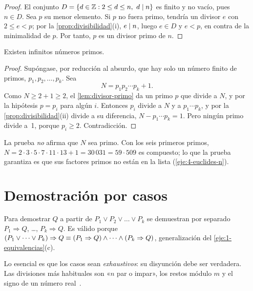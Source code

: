 \begin{proof}
El conjunto $D=\{d\in\mathbb{Z}: 2\le d\le n,\ d\mid n\}$ es finito y no vacío, pues $n\in D$. Sea $p$ su menor elemento. Si $p$ no fuera primo, tendría un divisor $e$ con $2\le e<p$; por la \cref{prop:divisibilidad}(i), $e\mid n$, luego $e\in D$ y $e<p$, en contra de la minimalidad de $p$. Por tanto, $p$ es un divisor primo de $n$.
\end{proof}

\begin{teorema}[Euclides]\label{teo:euclides}
Existen infinitos números primos.
\end{teorema}

\begin{proof}
Supóngase, por reducción al absurdo, que hay solo un número finito de primos, $p_1,p_2,\dots,p_k$. Sea
\[
N=p_1p_2\cdots p_k+1.
\]
Como $N\ge 2+1\ge 2$, el \cref{lem:divisor-primo} da un primo $p$ que divide a $N$, y por la hipótesis $p=p_i$ para algún $i$. Entonces $p_i$ divide a $N$ y a $p_1\cdots p_k$, y por la \cref{prop:divisibilidad}(ii) divide a su diferencia, $N-p_1\cdots p_k=1$. Pero ningún primo divide a~1, porque $p_i\ge 2$. Contradicción.
\end{proof}

\begin{observacion}
La prueba \emph{no} afirma que $N$ sea primo. Con los seis primeros primos, $N=2\cdot 3\cdot 5\cdot 7\cdot 11\cdot 13+1=30\,031=59\cdot 509$ es compuesto; lo que la prueba garantiza es que sus factores primos no están en la lista (\cref{eje:4-euclides-n}).
\end{observacion}

\section{Demostración por casos}

\begin{definicion}\label{def:casos}
Para demostrar $Q$ a partir de $P_1\vee P_2\vee\dots\vee P_k$ se demuestran por separado $P_1\Rightarrow Q$, \dots, $P_k\Rightarrow Q$. Es válido porque $(P_1\vee\dots\vee P_k)\Rightarrow Q\equiv(P_1\Rightarrow Q)\wedge\dots\wedge(P_k\Rightarrow Q)$, generalización del \cref{eje:1-equivalencias}(c).
\end{definicion}

Lo esencial es que los casos sean \emph{exhaustivos}: su disyunción debe ser verdadera. Las divisiones más habituales son «$n$ par o impar», los restos módulo $m$ y el signo de un número real~\cite[§4.4]{hammack}.

